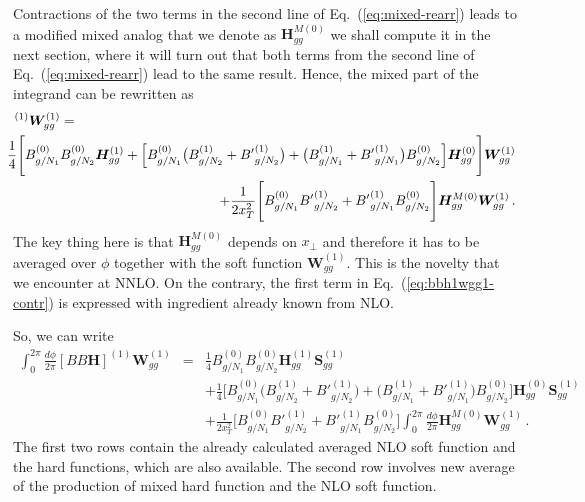 \documentclass[a4paper,11pt]{report}
\numberwithin{equation}{section}
\newcommand{\bfS}{\bm{S}}
\newcommand{\bfH}{\bm{H}}
\begin{document}
%
Contractions of the two terms in the second line of Eq.~(\ref{eq:mixed-rearr})
leads to a modified mixed analog that we denote as
$\bm{H}_{gg}^{M (0)}$ we shall compute it in the next section, where it will turn
out that both terms from the second line of Eq.~(\ref{eq:mixed-rearr}) lead to
the same result. Hence, the mixed part of the integrand can be rewritten as
%
\begin{eqnarray}
  [BB\bfH]^{(1)}\bm{W}^{(1)}_{gg}  & = & 
  \nonumber \\
  & &
  \hspace{-60pt}
  \frac{1}{4}
  \Bigg[
  B_{g/N_1}^{(0)} B_{g/N_2}^{(0)}
  \bm{H}^{(1)}_{gg}
  +
  \Big[
  B_{g/N_1}^{(0)} \big(B_{g/N_2}^{(1)} +  {B'}_{g/N_2}^{(1)}\big) +
  \big(B_{g/N_1}^{(1)} + {B'}_{g/N_1}^{(1)} \big) B_{g/N_2}^{(0)}
  \Big] 
  \bm{H}^{(0)}_{gg}
  \Bigg]\bm{W}^{(1)}_{gg}
  \nonumber 
  \\
  & & \hspace{-60pt} +
  \frac{1}{2 x_T^2}
  \Bigg[
  B_{g/N_1}^{(0)} {B'}_{g/N_2}^{(1)}
  +
  {B'}_{g/N_1}^{(1)} B_{g/N_2}^{(0)} 
  \Bigg]
  \bm{H}^{M(0)}_{gg}\bm{W}^{(1)}_{gg}\,.
  \label{eq:bbh1wgg1-contr}
\end{eqnarray}
%
The key thing here is that $\bm{H}^{M(0)}_{gg}$ depends on $x_\perp$ and
therefore it has to be averaged over $\phi$ together with the soft function 
$\bm{W}^{(1)}_{gg}$. This is the novelty that we encounter at NNLO. On the
contrary, the first term in Eq.~(\ref{eq:bbh1wgg1-contr}) is expressed with
ingredient already known from NLO.

So, we can write
%
\begin{eqnarray}
  \int_0^{2\pi} \frac{d\phi}{2\pi}[BB\bfH]^{(1)}\bm{W}^{(1)}_{gg}  & = & 
  \frac{1}{4} B_{g/N_1}^{(0)} B_{g/N_2}^{(0)}
  \bm{H}^{(1)}_{gg} \bfS_{gg}^{(1)}
  \nonumber \\
  & &
  + \frac{1}{4}
  \Big[
  B_{g/N_1}^{(0)} \big(B_{g/N_2}^{(1)} +  {B'}_{g/N_2}^{(1)}\big) +
  \big(B_{g/N_1}^{(1)} + {B'}_{g/N_1}^{(1)} \big) B_{g/N_2}^{(0)}
  \Big] 
  \bm{H}^{(0)}_{gg}
  \bm{S}^{(1)}_{gg}
  \nonumber 
  \\
  & & +
  \frac{1}{2 x_T^2}
  \Bigg[
  B_{g/N_1}^{(0)} {B'}_{g/N_2}^{(1)}
  +
  {B'}_{g/N_1}^{(1)} B_{g/N_2}^{(0)} 
  \Bigg]
  \int_0^{2\pi} \frac{d\phi}{2\pi}
  \bm{H}^{M(0)}_{gg}\bm{W}^{(1)}_{gg}\,.
  \label{eq:bbh1wgg1-av}
\end{eqnarray}
%
The first two rows contain the already calculated averaged NLO soft function and
the hard functions, which are also available. The second row involves new
average of the production of mixed hard function and the NLO soft function.
\end{document}
